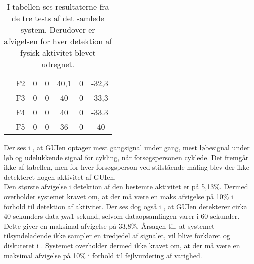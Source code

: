 \begin{table}[H]
{\begin{tabular}{ccccccc}
		& F2             & 0                                                                                                & 0                                                                                                & 40,1       & 0 & -32,3                                                                                             \\
		& F3             & 0                                                                                                  & 0                                                                                                & 40      & 0   & -33,3                                                                                           \\
		& F4             & 0                                                                                                  & 0                                                                                                & 40    & 0   & -33.3                                                                                              \\
		& F5             & 0                                                                                                  & 0                                                                                                & 36 & 0 & -40  \\ \hline                                                                                                
		\end{tabular}
	}
		\caption{I tabellen ses resultaterne fra de tre tests af det samlede system. Derudover er afvigelsen for hver detektion af fysisk aktivitet blevet udregnet.}
		\label{tab:samlet_sys_test1}
\end{table}\vspace{-.5cm}
Der ses i , at GUIen optager mest gangsignal under gang, mest løbesignal under løb og udelukkende signal for cykling, når forsøgspersonen cyklede. Det fremgår ikke af tabellen, men for hver forsøgsperson ved stilstående måling blev der ikke detekteret nogen aktivitet af GUIen. \\
Den største afvigelse i detektion af den bestemte aktivitet er på 5,13\%. Dermed overholder systemet kravet om, at der må være en maks afvigelse på 10\% i forhold til detektion af aktivitet. Der ses dog også i , at GUIen detekterer cirka 40 sekunders data $pm$1 sekund, selvom dataopsamlingen varer i 60 sekunder. Dette giver en maksimal afvigelse på 33,8\%. Årsagen til, at systemet tilsyndeladende ikke sampler en tredjedel af signalet, vil blive forklaret og diskuteret i . Systemet overholder dermed ikke kravet om, at der må være en maksimal afvigelse på 10\% i forhold til fejlvurdering af varighed.

